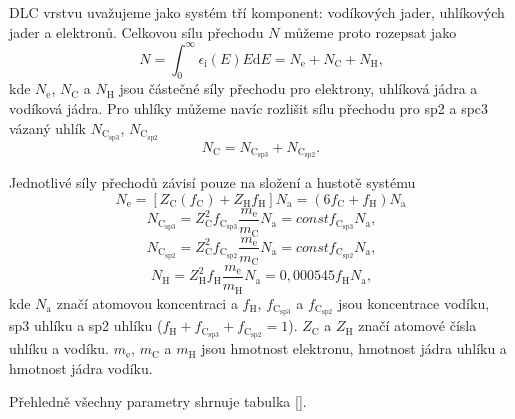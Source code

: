 DLC vrstvu uvažujeme jako systém tří komponent: vodíkových jader, uhlíkových jader a elektronů. Celkovou sílu přechodu $N$ můžeme proto rozepsat jako
\begin{equation}
N = \int_0^\infty \epsilon_\mathrm{i}(E) E \mathrm{d}E = N_\mathrm{e} + N_\mathrm{C} + N_\mathrm{H} \text{,}
\end{equation} 
kde $N_\mathrm{e}$, $N_\mathrm{C}$ a $N_\mathrm{H}$ jsou částečné síly přechodu pro elektrony, uhlíková jádra a vodíková jádra. Pro uhlíky můžeme navíc rozlišit sílu přechodu pro sp2 a spc3 vázaný uhlík $N_\mathrm{C_{sp3}}$, $N_\mathrm{C_{sp2}}$
\begin{equation}
N_\mathrm{C} = N_\mathrm{C_{sp3}} + N_\mathrm{C_{sp2}} \text{.}
\end{equation} 

Jednotlivé síly přechodů závisí pouze na složení a hustotě systému
\begin{equation}
N_\mathrm{e} = [Z_\mathrm{C}(f_\mathrm{C}) + Z_\mathrm{H} f_\mathrm{H}] N_\mathrm{a} = (6f_\mathrm{C} + f_\mathrm{H})N_\mathrm{a}
\end{equation}
\begin{equation}
N_\mathrm{C_{sp3}} = Z^2_\mathrm{C} f_\mathrm{C_{sp3}} \frac{m_\mathrm{e}}{m_\mathrm{C}} N_\mathrm{a} = const f_\mathrm{C_{sp3}} N_\mathrm{a} \text{,}
\end{equation}
\begin{equation}
N_\mathrm{C_{sp2}} = Z^2_\mathrm{C} f_\mathrm{C_{sp2}} \frac{m_\mathrm{e}}{m_\mathrm{C}} N_\mathrm{a} = const f_\mathrm{C_{sp2}} N_\mathrm{a} \text{,}
\end{equation}
\begin{equation}
N_\mathrm{H} = Z^2_\mathrm{H} f_\mathrm{H} \frac{m_\mathrm{e}}{m_\mathrm{H}} N_\mathrm{a} = 0,000545 f_\mathrm{H} N_\mathrm{a} \text{,}
\end{equation}
kde $N_\mathrm{a}$ značí atomovou koncentraci a $f_\mathrm{H}$, $f_\mathrm{C_{sp3}}$ a $f_\mathrm{C_{sp2}}$ jsou koncentrace vodíku, sp3 uhlíku a sp2 uhlíku ($f_\mathrm{H} + f_\mathrm{C_{sp3}} + f_\mathrm{C_{sp2}} =1 $). $Z_\mathrm{C}$ a $Z_\mathrm{H}$ značí atomové čísla uhlíku a vodíku. $m_\mathrm{e}$, $m_\mathrm{C}$ a $m_\mathrm{H}$ jsou hmotnost elektronu, hmotnost jádra uhlíku a hmotnost jádra vodíku. 



Přehledně všechny parametry shrnuje tabulka \ref{}.

